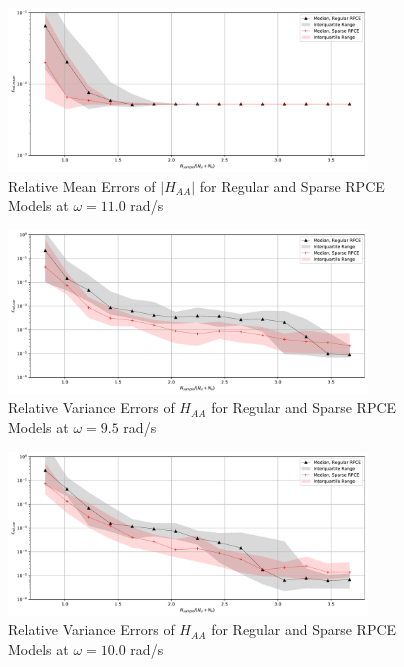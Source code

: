 \begin{figure}[H]
    \centering
    \includegraphics[width=0.85\textwidth]{
        plots/surrogate/plot_2_A_6.pdf
    }
    \caption{%
        Relative Mean Errors of $\left|H_{AA}\right|$ for Regular and Sparse RPCE Models at $\omega=11.0$ rad/s
    }
    \label{mean_sRPCE_A_A_6}
\end{figure}
\begin{figure}[H]
    \centering
    \includegraphics[width=0.85\textwidth]{
        plots/surrogate/plot_3_A_3.pdf
    }
    \caption{%
        Relative Variance Errors of $H_{AA}$ for Regular and Sparse RPCE Models at $\omega=9.5$ rad/s
    }
    \label{var_sRPCE_A_A_3}
\end{figure}
\begin{figure}[H]
    \centering
    \includegraphics[width=0.85\textwidth]{
        plots/surrogate/plot_3_A_4.pdf
    }
    \caption{%
        Relative Variance Errors of $H_{AA}$ for Regular and Sparse RPCE Models at $\omega=10.0$ rad/s
    }
\end{figure}
